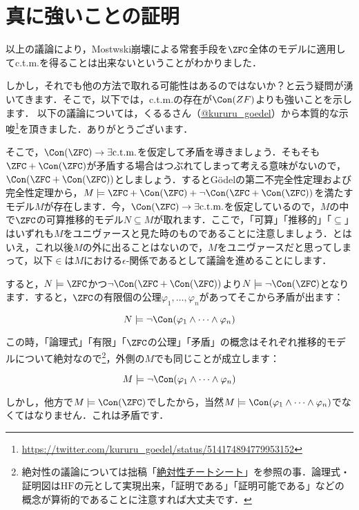 \documentclass[a4j]{ltjsarticle}
\begin{document}
\section{真に強いことの証明}
以上の議論により，Mostwski崩壊による常套手段を$\ZFC$全体のモデルに適用してc.t.m.を得ることは出来ないということがわかりました．

しかし，それでも他の方法で取れる可能性はあるのではないか？と云う疑問が湧いてきます．そこで，以下では，c.t.m.の存在が$\Con(ZF)$よりも強いことを示します．
以下の議論については，くるるさん（\href{https://twitter.com/kururu_goedel}{@kururu\_goedel}）から本質的な示唆\footnote{\url{https://twitter.com/kururu_goedel/status/514174894779953152}}を頂きました．ありがとうございます．

そこで，$\Con(\ZFC) \rightarrow \exists \text{c.t.m.}$を仮定して矛盾を導きましょう．そもそも$\ZFC + \Con(\ZFC)$が矛盾する場合はつぶれてしまって考える意味がないので，$\Con(\ZFC + \Con(\ZFC))$としましょう．するとG\"{o}delの第二不完全性定理および完全性定理から，$M \models \ZFC + \Con(\ZFC) + \neg \Con(\ZFC + \Con(\ZFC))$を満たすモデル$M$が存在します．今，$\Con(\ZFC) \rightarrow \exists \text{c.t.m.}$を仮定しているので，$M$の中で$\ZFC$の可算推移的モデル$N \subseteq M$が取れます．ここで，「可算」「推移的」「$\subseteq$」はいずれも$M$をユニヴァースと見た時のものであることに注意しましょう．とはいえ，これ以後$M$の外に出ることはないので，$M$をユニヴァースだと思ってしまって，以下$\in$は$M$における$\epsilon$-関係であるとして議論を進めることにします．

すると，$N \models \ZFC$かつ$\neg \Con(\ZFC + \Con(\ZFC))$より$N \models \neg \Con(\ZFC)$となります．すると，$\ZFC$の有限個の公理$\varphi_1, \dots, \varphi_n$があってそこから矛盾が出ます：

\[
N \models \neg \Con(\varphi_1 \wedge \dots \wedge \varphi_n)
\]

この時，「論理式」「有限」「$\ZFC$の公理」「矛盾」の概念はそれぞれ推移的モデルについて絶対なので\footnote{絶対性の議論については拙稿「\href{https://konn-san.com/math/absoluteness-cheatsheet.html}{絶対性チートシート}」を参照の事．論理式・証明図は$\mathrm{HF}$の元として実現出来，「証明である」「証明可能である」などの概念が算術的であることに注意すれば大丈夫です．}，外側の$M$でも同じことが成立します：

\[
M \models \neg \Con(\varphi_1 \wedge \dots \wedge \varphi_n)
\]

しかし，他方で$M \models \Con(\ZFC)$でしたから，当然$M \models \Con(\varphi_1 \wedge \dots \wedge \varphi_n)$でなくてはなりません．これは矛盾です．

\nocite{Eda:2010}
\printbibliography[title=参考文献]
\end{document}
